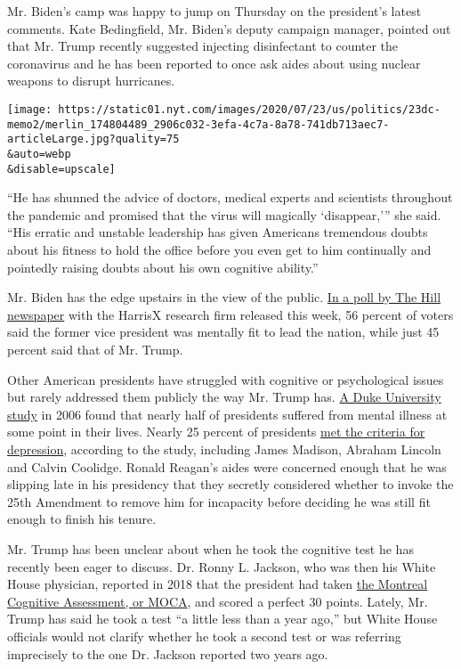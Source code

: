 Mr. Biden's camp was happy to jump on Thursday on the president's latest
comments. Kate Bedingfield, Mr. Biden's deputy campaign manager, pointed
out that Mr. Trump recently suggested injecting disinfectant to counter
the coronavirus and he has been reported to once ask aides about using
nuclear weapons to disrupt hurricanes.

\texttt{[image: https://static01.nyt.com/images/2020/07/23/us/politics/23dc-memo2/merlin\_174804489\_2906c032-3efa-4c7a-8a78-741db713aec7-articleLarge.jpg?quality=75\\\&auto=webp\\\&disable=upscale]}

``He has shunned the advice of doctors, medical experts and scientists
throughout the pandemic and promised that the virus will magically
`disappear,''' she said. ``His erratic and unstable leadership has given
Americans tremendous doubts about his fitness to hold the office before
you even get to him continually and pointedly raising doubts about his
own cognitive ability.''

Mr. Biden has the edge upstairs in the view of the public.
\href{https://thehill.com/hilltv/what-americas-thinking/508159-poll-trump-trails-biden-voter-views-mental-physical-fitness}{In
a poll by The Hill newspaper} with the HarrisX research firm released
this week, 56 percent of voters said the former vice president was
mentally fit to lead the nation, while just 45 percent said that of Mr.
Trump.

Other American presidents have struggled with cognitive or psychological
issues but rarely addressed them publicly the way Mr. Trump has.
\href{https://www.pubfacts.com/detail/16462555/Mental-illness-in-US-Presidents-between-1776-and-1974-a-review-of-biographical-sources}{A
Duke University study} in 2006 found that nearly half of presidents
suffered from mental illness at some point in their lives. Nearly 25
percent of presidents
\href{https://www.psychologytoday.com/us/blog/the-squeaky-wheel/201602/study-half-all-presidents-suffered-mental-illness}{met
the criteria for depression}, according to the study, including James
Madison, Abraham Lincoln and Calvin Coolidge. Ronald Reagan's aides were
concerned enough that he was slipping late in his presidency that they
secretly considered whether to invoke the 25th Amendment to remove him
for incapacity before deciding he was still fit enough to finish his
tenure.

Mr. Trump has been unclear about when he took the cognitive test he has
recently been eager to discuss. Dr. Ronny L. Jackson, who was then his
White House physician, reported in 2018 that the president had taken
\href{https://www.nytimes.com/article/trump-cognitive-test.html}{the
Montreal Cognitive Assessment, or MOCA}, and scored a perfect 30 points.
Lately, Mr. Trump has said he took a test ``a little less than a year
ago,'' but White House officials would not clarify whether he took a
second test or was referring imprecisely to the one Dr. Jackson reported
two years ago.

